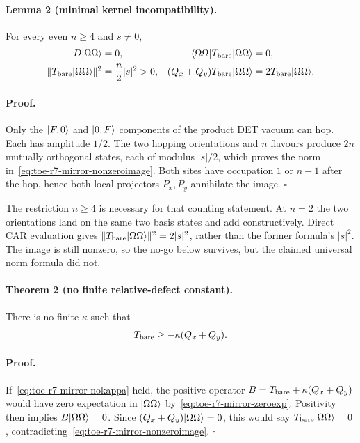 \paragraph{Lemma 2 (minimal kernel incompatibility).}
For every even $n\geq4$ and $s\neq0$,
\begin{align}
 D|\Omega\Omega\rangle&=0,
 &\langle\Omega\Omega|T_{\rm bare}|\Omega\Omega\rangle&=0,\label{eq:toe-r7-mirror-zeroexp}\\
 \|T_{\rm bare}|\Omega\Omega\rangle\|^2&=\frac n2|s|^2>0,
 &(Q_x+Q_y)T_{\rm bare}|\Omega\Omega\rangle&=
 2T_{\rm bare}|\Omega\Omega\rangle.
 \label{eq:toe-r7-mirror-nonzeroimage}
\end{align}

\paragraph{Proof.}
Only the $|F,0\rangle$ and $|0,F\rangle$ components of the product DET vacuum can
hop.  Each has amplitude $1/2$.  The two hopping orientations and $n$ flavours
produce $2n$ mutually orthogonal states, each of modulus $|s|/2$, which proves
the norm in~\eqref{eq:toe-r7-mirror-nonzeroimage}.  Both sites have occupation $1$ or $n-1$
after the hop, hence both local projectors $P_x,P_y$ annihilate the image.
\hfill$\square$

The restriction $n\geq4$ is necessary for that counting statement.  At
$n=2$ the two orientations land on the same two basis states and add
constructively.  Direct CAR evaluation gives
$\|T_{\rm bare}|\Omega\Omega\rangle\|^2=2|s|^2$, rather than the former
formula's $|s|^2$.  The image is still nonzero, so the no-go below survives,
but the claimed universal norm formula did not.

\paragraph{Theorem 2 (no finite relative-defect constant).}
There is no finite $\kappa$ such that
\begin{equation}
 T_{\rm bare}\geq-\kappa(Q_x+Q_y).
 \label{eq:toe-r7-mirror-nokappa}
\end{equation}

\paragraph{Proof.}
If~\eqref{eq:toe-r7-mirror-nokappa} held, the positive operator
$B=T_{\rm bare}+\kappa(Q_x+Q_y)$ would have zero expectation in
$|\Omega\Omega\rangle$ by~\eqref{eq:toe-r7-mirror-zeroexp}.  Positivity then implies
$B|\Omega\Omega\rangle=0$.  Since $(Q_x+Q_y)|\Omega\Omega\rangle=0$, this would say
$T_{\rm bare}|\Omega\Omega\rangle=0$, contradicting~\eqref{eq:toe-r7-mirror-nonzeroimage}.
\hfill$\square$

